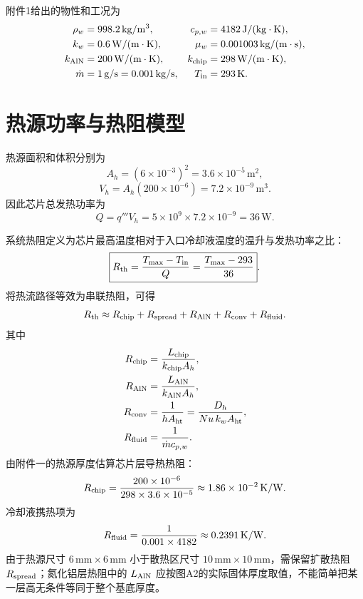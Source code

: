 \documentclass[UTF8,a4paper,12pt]{ctexart}
\begin{document}
附件1给出的物性和工况为
\begin{align}
\rho_w&=998.2\,\mathrm{kg/m^3}, & c_{p,w}&=4182\,\mathrm{J/(kg\cdot K)},\\
k_w&=0.6\,\mathrm{W/(m\cdot K)}, & \mu_w&=0.001003\,\mathrm{kg/(m\cdot s)},\\
k_{\rm AlN}&=200\,\mathrm{W/(m\cdot K)}, & k_{\rm chip}&=298\,\mathrm{W/(m\cdot K)},\\
\dot m&=1\,\mathrm{g/s}=0.001\,\mathrm{kg/s}, & T_{\rm in}&=293\,\mathrm K.
\end{align}

\section{热源功率与热阻模型}

热源面积和体积分别为
\begin{equation}
A_h=(6\times10^{-3})^2=3.6\times10^{-5}\,\mathrm{m^2},
\end{equation}
\begin{equation}
V_h=A_h(200\times10^{-6})=7.2\times10^{-9}\,\mathrm{m^3}.
\end{equation}
因此芯片总发热功率为
\begin{equation}
Q=q'''V_h=5\times10^9\times7.2\times10^{-9}=36\,\mathrm W.
\end{equation}

系统热阻定义为芯片最高温度相对于入口冷却液温度的温升与发热功率之比：
\begin{equation}
\boxed{R_{\rm th}=\frac{T_{\max}-T_{\rm in}}{Q}=\frac{T_{\max}-293}{36}}.
\end{equation}
将热流路径等效为串联热阻，可得
\begin{equation}
R_{\rm th}\approx R_{\rm chip}+R_{\rm spread}+R_{\rm AlN}+R_{\rm conv}+R_{\rm fluid}.
\end{equation}
其中
\begin{align}
R_{\rm chip}&=\frac{L_{\rm chip}}{k_{\rm chip}A_h},\\
R_{\rm AlN}&=\frac{L_{\rm AlN}}{k_{\rm AlN}A_h},\\
R_{\rm conv}&=\frac{1}{hA_{\rm ht}}=\frac{D_h}{Nu\,k_wA_{\rm ht}},\\
R_{\rm fluid}&=\frac{1}{\dot m c_{p,w}}.
\end{align}
由附件一的热源厚度估算芯片层导热热阻：
\begin{equation}
R_{\rm chip}=\frac{200\times10^{-6}}{298\times3.6\times10^{-5}}
\approx1.86\times10^{-2}\,\mathrm{K/W}.
\end{equation}
冷却液携热项为
\begin{equation}
R_{\rm fluid}=\frac{1}{0.001\times4182}\approx0.2391\,\mathrm{K/W}.
\end{equation}
由于热源尺寸 $6\,\mathrm{mm}\times6\,\mathrm{mm}$ 小于散热区尺寸 $10\,\mathrm{mm}\times10\,\mathrm{mm}$，需保留扩散热阻 $R_{\rm spread}$；氮化铝层热阻中的 $L_{\rm AlN}$ 应按图A2的实际固体厚度取值，不能简单把某一层高无条件等同于整个基底厚度。
\end{document}
